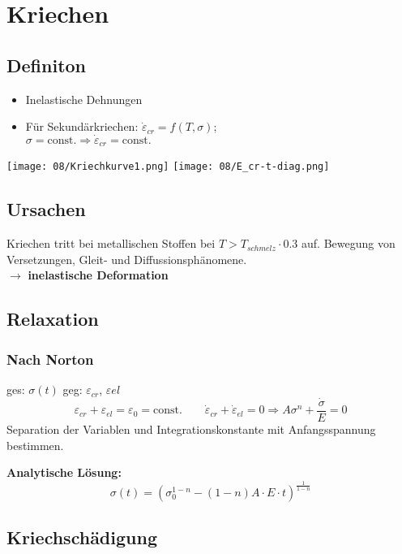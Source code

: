 \section{Kriechen}
    \subsection{Definiton}
        \begin{itemize}
            \item Inelastische Dehnungen
            \item Für Sekundärkriechen: $\dot{\varepsilon}_{cr} = f(T,\sigma)$;\\$\sigma = \textrm{const.} \Rightarrow \dot{\varepsilon}_{cr}= \textrm{const.}$
        \end{itemize}
        \vspace{-4mm}
        \texttt{[image: 08/Kriechkurve1.png]}
        \texttt{[image: 08/E\_cr-t-diag.png]}
    \subsection{Ursachen}
        Kriechen tritt bei metallischen Stoffen bei $ T > T_{schmelz} \cdot 0.3  $ auf.
        Bewegung von Versetzungen, Gleit- und Diffussionsphänomene. 
        \\$\rightarrow$ \textbf{inelastische Deformation}
        \vspace{2mm}
    \subsection{Relaxation}
        \subsubsection{Nach Norton}
            ges: $\sigma(t)$ geg: $\varepsilon_{cr}$, $\varepsilon{el}$
            \[\varepsilon_{cr}+\varepsilon_{el}=\varepsilon_0=\textrm{const.} \qquad \dot{\varepsilon}_{cr}+\dot{\varepsilon}_{el}=0 \Rightarrow A\sigma^n + \frac{\dot{\sigma}}{E}=0\]
            Separation der Variablen und Integrationskonstante mit Anfangsspannung bestimmen.
            
            \textbf{Analytische Lösung:}
            \vspace{-2mm}\[\sigma(t)=\left(\sigma_{0}^{1-n}-(1-n)A\cdot E\cdot t\right)^{\frac{1}{1-n}}\]
            
    \subsection{Kriechschädigung}
